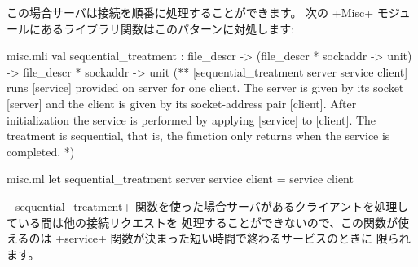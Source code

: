 この場合サーバは接続を順番に処理することができます。
次の \ml+Misc+ モジュールにあるライブラリ関数はこのパターンに対処します:
\begin{codefile}{misc.mli}
val sequential_treatment :
file_descr -> (file_descr * sockaddr -> unit) ->
file_descr * sockaddr -> unit
(** [sequential_treatment server service client] runs [service] provided
      on server for one client. The server is given by its socket [server]
      and the client is given by its socket-address pair [client]. After
      initialization the service is performed by applying [service] to
      [client]. The treatment is sequential, that is, the function only
      returns when the service is completed. *)
\end{codefile}
%
\begin{listingcodefile}{misc.ml}
let sequential_treatment server service client = service client
\end{listingcodefile}
\ml+sequential_treatment+ 関数を使った場合サーバがあるクライアントを処理している間は他の接続リクエストを
処理することができないので、この関数が使えるのは \ml+service+ 関数が決まった短い時間で終わるサービスのときに
限られます。

